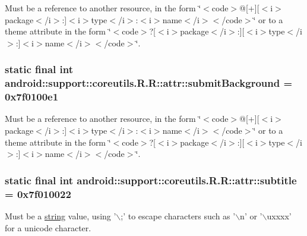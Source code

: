 Must be a reference to another resource, in the form \char`\"{}$<$code$>$@\mbox{[}+\mbox{]}\mbox{[}$<$i$>$package$<$/i$>$:\mbox{]}$<$i$>$type$<$/i$>$:$<$i$>$name$<$/i$>$$<$/code$>$\char`\"{} or to a theme attribute in the form \char`\"{}$<$code$>$?\mbox{[}$<$i$>$package$<$/i$>$:\mbox{]}\mbox{[}$<$i$>$type$<$/i$>$:\mbox{]}$<$i$>$name$<$/i$>$$<$/code$>$\char`\"{}. \hypertarget{classandroid_1_1support_1_1coreutils_1_1_r_1_1attr_8f99d7a564048820f8e2628e96411612}{
\subsubsection[{submitBackground}]{\setlength{\rightskip}{0pt plus 5cm}static final int android::support::coreutils.R.R::attr::submitBackground = 0x7f0100e1}}
\label{classandroid_1_1support_1_1coreutils_1_1_r_1_1attr_8f99d7a564048820f8e2628e96411612}


Must be a reference to another resource, in the form \char`\"{}$<$code$>$@\mbox{[}+\mbox{]}\mbox{[}$<$i$>$package$<$/i$>$:\mbox{]}$<$i$>$type$<$/i$>$:$<$i$>$name$<$/i$>$$<$/code$>$\char`\"{} or to a theme attribute in the form \char`\"{}$<$code$>$?\mbox{[}$<$i$>$package$<$/i$>$:\mbox{]}\mbox{[}$<$i$>$type$<$/i$>$:\mbox{]}$<$i$>$name$<$/i$>$$<$/code$>$\char`\"{}. \hypertarget{classandroid_1_1support_1_1coreutils_1_1_r_1_1attr_59bcdd8fc9f88111cb1ef3d97ffd90ed}{
\subsubsection[{subtitle}]{\setlength{\rightskip}{0pt plus 5cm}static final int android::support::coreutils.R.R::attr::subtitle = 0x7f010022}}
\label{classandroid_1_1support_1_1coreutils_1_1_r_1_1attr_59bcdd8fc9f88111cb1ef3d97ffd90ed}


Must be a \hyperlink{classandroid_1_1support_1_1coreutils_1_1_r_1_1string}{string} value, using '$\backslash$;' to escape characters such as '$\backslash$n' or '$\backslash$uxxxx' for a unicode character. 

